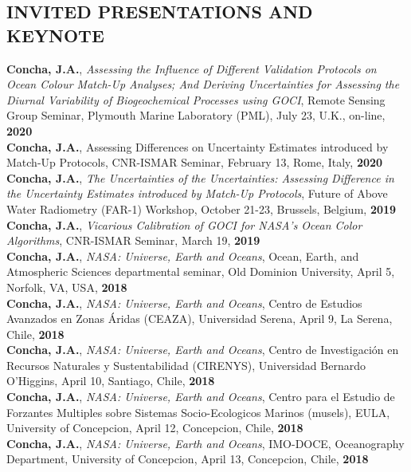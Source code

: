 \documentclass[11pt]{res}
\begin{document}
\begin{resume}
\section{INVITED PRESENTATIONS AND KEYNOTE}
\vspace{0.1in}
{\bf Concha, J.A.}, {\it Assessing the Influence of Different Validation Protocols on Ocean Colour Match-Up Analyses; And Deriving Uncertainties for Assessing the Diurnal Variability of Biogeochemical Processes using GOCI}, Remote Sensing Group Seminar, Plymouth Marine Laboratory (PML), July 23, U.K., on-line, {\bf 2020}
\vspace{0.1in}\\
{\bf Concha, J.A.}, {Assessing Differences on Uncertainty Estimates introduced by Match-Up Protocols}, CNR-ISMAR Seminar, February 13, Rome, Italy, {\bf 2020}
\vspace{0.1in}\\
{\bf Concha, J.A.}, {\it The Uncertainties of the Uncertainties: Assessing Difference in the Uncertainty Estimates introduced by Match-Up Protocols}, Future of Above Water Radiometry (FAR-1) Workshop, October 21-23, Brussels, Belgium, {\bf 2019}
\vspace{0.1in}\\
{\bf Concha, J.A.}, {\it  Vicarious Calibration of GOCI for NASA’s Ocean Color Algorithms}, CNR-ISMAR Seminar, March 19, {\bf 2019}
\vspace{0.1in}\\
{\bf Concha, J.A.}, {\it NASA: Universe, Earth and Oceans}, Ocean, Earth, and Atmospheric Sciences departmental seminar, Old Dominion University, April 5, Norfolk, VA, USA, {\bf 2018}
\vspace{0.1in}\\
{\bf Concha, J.A.}, {\it NASA: Universe, Earth and Oceans}, Centro de Estudios Avanzados en Zonas Áridas (CEAZA), Universidad Serena, April 9, La Serena, Chile, {\bf 2018}
\vspace{0.1in}\\
{\bf Concha, J.A.}, {\it NASA: Universe, Earth and Oceans}, Centro de Investigación en Recursos Naturales y Sustentabilidad (CIRENYS), Universidad Bernardo O'Higgins, April 10, Santiago, Chile, {\bf 2018}
\vspace{0.1in}\\
{\bf Concha, J.A.}, {\it NASA: Universe, Earth and Oceans}, Centro para el Estudio de Forzantes Multiples sobre Sistemas Socio-Ecologicos Marinos (musels), EULA, University of Concepcion, April 12, Concepcion, Chile, {\bf 2018}
\vspace{0.1in}\\
{\bf Concha, J.A.}, {\it NASA: Universe, Earth and Oceans}, IMO-DOCE, Oceanography Department, University of Concepcion, April 13, Concepcion, Chile, {\bf 2018}
\vspace{0.1in}\\
\vspace{-0.1in}

\end{resume}
\end{document}
